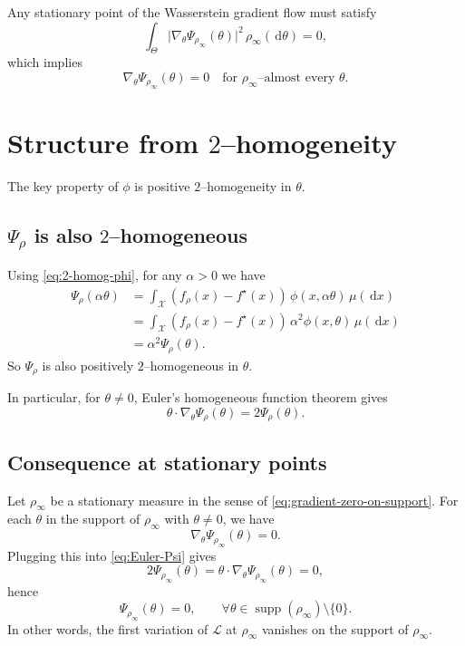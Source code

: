 \documentclass[11pt]{article}
\numberwithin{equation}{section}
\theoremstyle{definition}
\newcommand{\dd}{\,\mathrm{d}}
\newcommand{\1}{\mathbbm{1}}
\begin{document}
Any stationary point of the Wasserstein gradient flow must satisfy
\begin{equation}
\label{eq:stationary-gradient}
\int_\Theta \bigl|\nabla_\theta \Psi_{\rho_\infty}(\theta)\bigr|^2\,\rho_\infty(\dd\theta) = 0,
\end{equation}
which implies
\begin{equation}
\label{eq:gradient-zero-on-support}
\nabla_\theta \Psi_{\rho_\infty}(\theta) = 0
\quad\text{for }\rho_\infty\text{--almost every }\theta.
\end{equation}

\section{Structure from $2$--homogeneity}

The key property of $\phi$ is positive $2$--homogeneity in $\theta$.

\subsection{$\Psi_\rho$ is also $2$--homogeneous}

Using \eqref{eq:2-homog-phi}, for any $\alpha>0$ we have
\begin{align}
\Psi_\rho(\alpha\theta)
&= \int_{\mathcal{X}} (f_\rho(x)-f^\star(x))\,\phi(x,\alpha\theta)\,\mu(\dd x) \\
&= \int_{\mathcal{X}} (f_\rho(x)-f^\star(x))\,\alpha^2\phi(x,\theta)\,\mu(\dd x) \\
&= \alpha^2 \Psi_\rho(\theta).
\end{align}
So $\Psi_\rho$ is also positively $2$--homogeneous in $\theta$.

In particular, for $\theta\neq 0$, Euler's homogeneous function theorem gives
\begin{equation}
\label{eq:Euler-Psi}
\theta\cdot\nabla_\theta \Psi_\rho(\theta) = 2 \Psi_\rho(\theta).
\end{equation}

\subsection{Consequence at stationary points}

Let $\rho_\infty$ be a stationary measure in the sense of \eqref{eq:gradient-zero-on-support}. For each $\theta$ in the support of $\rho_\infty$ with $\theta\neq 0$, we have
\[
\nabla_\theta \Psi_{\rho_\infty}(\theta) = 0.
\]
Plugging this into \eqref{eq:Euler-Psi} gives
\[
2\Psi_{\rho_\infty}(\theta) 
= \theta\cdot\nabla_\theta \Psi_{\rho_\infty}(\theta) = 0,
\]
hence
\begin{equation}
\label{eq:Psi-zero-on-support}
\Psi_{\rho_\infty}(\theta) = 0,
\qquad \forall \theta\in\operatorname{supp}(\rho_\infty)\setminus\{0\}.
\end{equation}
In other words, the first variation of $\mathcal{L}$ at $\rho_\infty$ vanishes on the support of $\rho_\infty$.
\end{document}

